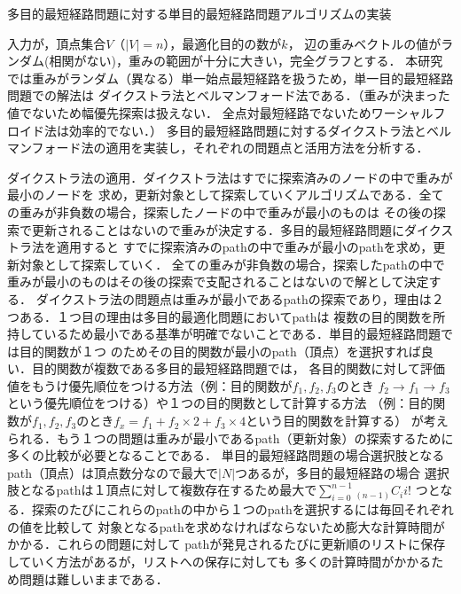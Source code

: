 \documentclass[12pt]{optlab-bachelor}
\begin{document}
\begin{description}
  \item[多目的最短経路問題に対する単目的最短経路問題アルゴリズムの実装]
\end{description}

入力が，頂点集合$V$（$|V|=n$），最適化目的の数が$k$，
辺の重みベクトルの値がランダム(相関がない)，重みの範囲が十分に大きい，完全グラフとする．
本研究では重みがランダム（異なる）単一始点最短経路を扱うため，単一目的最短経路問題での解法は
ダイクストラ法とベルマンフォード法である．（重みが決まった値でないため幅優先探索は扱えない．
全点対最短経路でないためワーシャルフロイド法は効率的でない．）
多目的最短経路問題に対するダイクストラ法とベルマンフォード法の適用を実装し，それぞれの問題点と活用方法を分析する．

ダイクストラ法の適用．ダイクストラ法はすでに探索済みのノードの中で重みが最小のノードを
求め，更新対象として探索していくアルゴリズムである．全ての重みが非負数の場合，探索したノードの中で重みが最小のものは
その後の探索で更新されることはないので重みが決定する．多目的最短経路問題にダイクストラ法を適用すると
すでに探索済みのpathの中で重みが最小のpathを求め，更新対象として探索していく．
全ての重みが非負数の場合，探索したpathの中で重みが最小のものはその後の探索で支配されることはないので解として決定する．
ダイクストラ法の問題点は重みが最小であるpathの探索であり，理由は２つある．１つ目の理由は多目的最適化問題においてpathは
複数の目的関数を所持しているため最小である基準が明確でないことである．単目的最短経路問題では目的関数が１つ
のためその目的関数が最小のpath（頂点）を選択すれば良い．目的関数が複数である多目的最短経路問題では，
各目的関数に対して評価値をもうけ優先順位をつける方法（例：目的関数が$f_1,f_2,f_3$のとき
$f_2 \rightarrow f_1 \rightarrow f_3 $という優先順位をつける）や１つの目的関数として計算する方法
（例：目的関数が$f_1,f_2,f_3$のとき$f_x = f_1 + f_2 \times 2 + f_3 \times 4$という目的関数を計算する）
が考えられる．もう１つの問題は重みが最小であるpath（更新対象）の探索するために多くの比較が必要となることである．
単目的最短経路問題の場合選択肢となるpath（頂点）は頂点数分なので最大で$|N|$つあるが，多目的最短経路の場合
選択肢となるpathは１頂点に対して複数存在するため最大で$\displaystyle \sum_{i=0}^{n-1} {}_{(n-1)}C_i i!$
つとなる．探索のたびにこれらのpathの中から１つのpathを選択するには毎回それぞれの値を比較して
対象となるpathを求めなければならないため膨大な計算時間がかかる．これらの問題に対して
pathが発見されるたびに更新順のリストに保存していく方法があるが，リストへの保存に対しても
多くの計算時間がかかるため問題は難しいままである．
\end{document}
